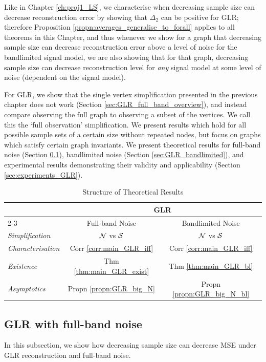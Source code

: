 Like in Chapter \ref{ch:proj1_LS}, we characterise when decreasing sample size can decrease reconstruction error by showing that $\Delta_{2}$ can be positive for GLR; therefore Proposition \ref{propn:averages_generalise_to_forall} applies to all theorems in this Chapter, and thus whenever we show for a graph that decreasing sample size can decrease reconstruction error above a level of noise for the bandlimited signal model, we are also showing that for that graph, decreasing sample size can decrease reconstruction level for \emph{any} signal model at some level of noise (dependent on the signal model).

For GLR, we show that the single vertex simplification presented in the previous chapter does not work (Section \ref{sec:GLR_full_band_overview}), and instead compare observing the full graph to observing a subset of the vertices. We call this the `full observation' simplification. We present results which hold for all possible sample sets of a certain size without repeated nodes, but focus on graphs which satisfy certain graph invariants. %
We present theoretical results for full-band noise (Section \ref{sec:GLR_full_band}), bandlimited noise (Section \ref{sec:GLR_bandlimited}), and experimental results demonstrating their validity and applicability (Section \ref{sec:experiments_GLR}). 


\begin{table}[h]
\caption{Structure of Theoretical Results}
\centering
\begin{tabular}{@{} l   c c @{}}
\toprule
 & \multicolumn{2}{c}{GLR} \\
\cmidrule(lr){2-3}
{} & Full-band Noise & Bandlimited Noise \\
\midrule
\emph{Simplification}  & {$\mathcal{N}$ vs $\mathcal{S}$}   & {$\mathcal{N}$ vs $\mathcal{S}$}  \\
\midrule
\emph{Characterisation} & {Corr \ref{corr:main_GLR_iff}} & {Corr \ref{corr:main_GLR_iff}} \\
\midrule
\emph{Existence} & Thm \ref{thm:main_GLR_exist} & Thm \ref{thm:main_GLR_bl}  \\
\midrule
\emph{Asymptotics} &  Propn \ref{propn:GLR_big_N} & Propn \ref{propn:GLR_big_N_bl}\\
\bottomrule
\end{tabular}
\label{tbl:general_theory_GLR}
\end{table}


\subsection{GLR with full-band noise}
\label{sec:GLR_full_band}
In this subsection, we show how decreasing sample size can decrease MSE under GLR reconstruction and full-band noise. 


